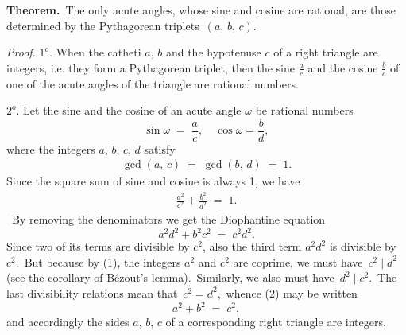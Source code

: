 \documentclass[12pt]{article}
\theoremstyle{definition}
\begin{document}
\textbf{Theorem.}\, The only acute angles, whose sine and cosine are rational, are those determined by the Pythagorean triplets \,$(a,\,b,\,c)$.

{\em Proof.} $1^{\underline{o}}$. When the catheti $a$, $b$ and the hypotenuse $c$ of a right triangle are integers, i.e. they form a Pythagorean triplet, then the sine $\frac{a}{c}$ and the cosine $\frac{b}{c}$ of one of the acute angles of the triangle are rational numbers.

$2^{\underline{o}}$. Let the sine and the cosine of an acute angle $\omega$ be rational numbers 
$$\sin\omega \;=\; \frac{a}{c}, \quad \cos\omega = \frac{b}{d},$$
where the integers $a$, $b$, $c$, $d$ satisfy
\begin{align}
\gcd(a,\,c) \;=\; \gcd(b,\,d) \;=\; 1.
\end{align}
Since the square sum of sine and cosine is always 1, we have\, 
\begin{align}
\frac{a^2}{c^2}\!+\!\frac{b^2}{d^2} \;=\; 1.
\end{align}
\, By removing the denominators we get the Diophantine equation
$$a^2d^2\!+\!b^2c^2 \;=\; c^2d^2.$$
Since two of its terms are divisible by $c^2$, also the third term $a^2d^2$ is divisible by $c^2$.\, But because by (1), the integers $a^2$ and $c^2$ are coprime, we must have \,$c^2 \mid d^2$ (see the corollary of B\'ezout's lemma).\, Similarly, we also must have \,$d^2 \mid c^2$.\, The last divisibility relations mean that\, $c^2 = d^2$,\, whence (2) may be written
$$a^2+b^2 \;=\; c^2,$$
and accordingly the sides $a,\,b,\,c$ of a corresponding right triangle are integers.



\end{document}
